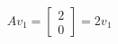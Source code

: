 \documentclass{article}
\begin{document}
\begin{align*}
Av_1 = \begin{bmatrix}2\\0\end{bmatrix} = 2v_1
\end{align*}
\end{document}
